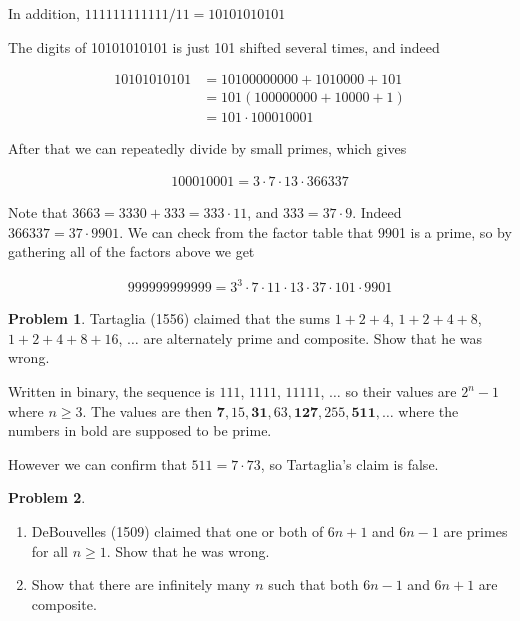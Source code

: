 \documentclass{article}
\theoremstyle{definition}
\newtheorem{problem}{Problem}[section]
\begin{document}
  In addition, $111111111111 / 11 =  10101010101$
  
  The digits of 10101010101 is just 101 shifted several times, and indeed
  
  \begin{align*}
    10101010101 &= 10100000000 + 1010000 + 101 \\
    &= 101 (100000000 + 10000 + 1) \\
    &= 101 \cdot 100010001
  \end{align*}
  
  After that we can repeatedly divide by small primes, which gives
  
  \begin{align*}
    100010001 = 3 \cdot 7 \cdot 13 \cdot 366337
  \end{align*}
  
  Note that $3663 = 3330 + 333 = 333 \cdot 11$, and $333 = 37 \cdot 9$.
  Indeed $366337 = 37 \cdot 9901$. We can check from the factor table that 9901 is a prime,
  so by gathering all of the factors above we get
  
  \begin{align*}
    999999999999 = 3^3 \cdot 7 \cdot 11 \cdot 13 \cdot 37 \cdot 101 \cdot 9901
  \end{align*}
  
  \begin{problem}
    Tartaglia (1556) claimed that the sums  $1 + 2 + 4$, $1 + 2 + 4 + 8$, $1 + 2 + 4 + 8 + 16$,
    $\dots$ are alternately prime and composite. Show that he was wrong.
  \end{problem}
  
    Written in binary, the sequence is $111$, $1111$, $11111$, $\dots$ so their values are
    $2^n - 1$ where $n \geq 3$. The values are then $\bm{7}, 15, \bm{31}, 63,
    \bm{127}, 255, \bm{511}, \dots$ where the numbers in bold are supposed to be prime.
    
    However we can confirm that $511 = 7 \cdot 73$, so Tartaglia's claim is false.
  
  \begin{problem}
    ~
  \end{problem}
  
  \begin{enumerate}[label=\alph*)]
    \item DeBouvelles (1509) claimed that one or both of $6n + 1$ and $6n - 1$ are primes for all $n \geq 1$. Show that he was wrong.
    \item Show that there are infinitely many $n$ such that both $6n - 1$ and $6n + 1$ are composite.
  \end{enumerate}
  
\end{document}
